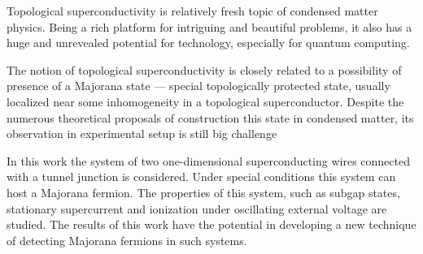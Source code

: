 Topological superconductivity is relatively fresh topic of condensed matter physics. Being a rich platform for intriguing and beautiful problems, it also has a huge and unrevealed potential for technology, especially for quantum computing.

The notion of topological superconductivity is closely related to a possibility of presence of a Majorana state --- special topologically protected state, usually localized near some inhomogeneity in a topological superconductor. Despite  the numerous theoretical proposals of construction this state in condensed matter, its observation in experimental setup is still big challenge

In this work the system of two one-dimensional superconducting wires connected with a tunnel junction is considered. Under special conditions this system can host a Majorana fermion. The properties of this system, such as subgap states, stationary supercurrent and ionization under  oscillating external voltage are studied. The results of this work have the potential in developing a new technique of detecting Majorana fermions in such systems.